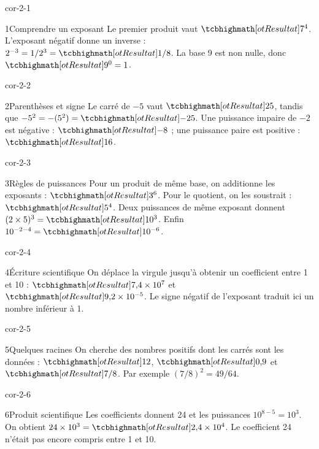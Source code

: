 \clearpage\pagestyle{otMain}\fontsize{11}{15}\selectfont{}
\begin{blocLivre}{cor-2-1}\begin{corrige}{1}{Comprendre un exposant}
Le premier produit vaut $\res{7^4}$. L’exposant négatif donne un inverse : $2^{-3}=1/2^3=\res{1/8}$. La base 9 est non nulle, donc $\res{9^0=1}$.
\end{corrige}\end{blocLivre}
\begin{blocLivre}{cor-2-2}\begin{corrige}{2}{Parenthèses et signe}
Le carré de $-5$ vaut $\res{25}$, tandis que $-5^2=-(5^2)=\res{-25}$. Une puissance impaire de $-2$ est négative : $\res{-8}$ ; une puissance paire est positive : $\res{16}$.
\end{corrige}\end{blocLivre}
\begin{blocLivre}{cor-2-3}\begin{corrige}{3}{Règles de puissances}
Pour un produit de même base, on additionne les exposants : $\res{3^6}$. Pour le quotient, on les soustrait : $\res{5^4}$. Deux puissances de même exposant donnent $(2\times5)^3=\res{10^3}$. Enfin $10^{-2-4}=\res{10^{-6}}$.
\end{corrige}\end{blocLivre}
\begin{blocLivre}{cor-2-4}\begin{corrige}{4}{Écriture scientifique}
On déplace la virgule jusqu’à obtenir un coefficient entre 1 et 10 : $\res{7{,}4\times10^7}$ et $\res{9{,}2\times10^{-5}}$. Le signe négatif de l’exposant traduit ici un nombre inférieur à 1.
\end{corrige}\end{blocLivre}
\begin{blocLivre}{cor-2-5}\begin{corrige}{5}{Quelques racines}
On cherche des nombres positifs dont les carrés sont les données : $\res{12}$, $\res{0{,}9}$ et $\res{7/8}$. Par exemple $(7/8)^2=49/64$.
\end{corrige}\end{blocLivre}
\begin{blocLivre}{cor-2-6}\begin{corrige}{6}{Produit scientifique}
Les coefficients donnent 24 et les puissances $10^{8-5}=10^3$. On obtient $24\times10^3=\res{2{,}4\times10^4}$. Le coefficient 24 n’était pas encore compris entre 1 et 10.
\end{corrige}\end{blocLivre}
